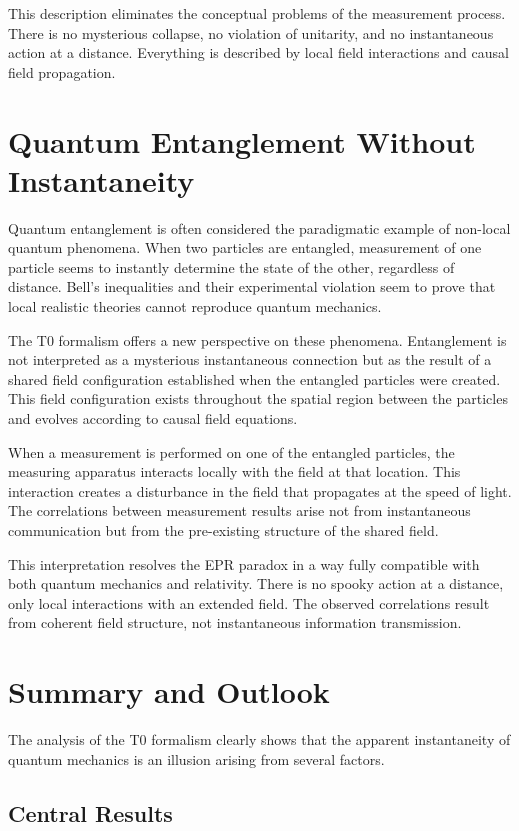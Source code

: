\documentclass[12pt,a4paper]{article}
\begin{document}
	This description eliminates the conceptual problems of the measurement process. There is no mysterious collapse, no violation of unitarity, and no instantaneous action at a distance. Everything is described by local field interactions and causal field propagation.
	
	\section{Quantum Entanglement Without Instantaneity}
	
	Quantum entanglement is often considered the paradigmatic example of non-local quantum phenomena. When two particles are entangled, measurement of one particle seems to instantly determine the state of the other, regardless of distance. Bell's inequalities and their experimental violation seem to prove that local realistic theories cannot reproduce quantum mechanics.
	
	The T0 formalism offers a new perspective on these phenomena. Entanglement is not interpreted as a mysterious instantaneous connection but as the result of a shared field configuration established when the entangled particles were created. This field configuration exists throughout the spatial region between the particles and evolves according to causal field equations.
	
	When a measurement is performed on one of the entangled particles, the measuring apparatus interacts locally with the field at that location. This interaction creates a disturbance in the field that propagates at the speed of light. The correlations between measurement results arise not from instantaneous communication but from the pre-existing structure of the shared field.
	
	This interpretation resolves the EPR paradox in a way fully compatible with both quantum mechanics and relativity. There is no spooky action at a distance, only local interactions with an extended field. The observed correlations result from coherent field structure, not instantaneous information transmission.
	
	\section{Summary and Outlook}
	
	The analysis of the T0 formalism clearly shows that the apparent instantaneity of quantum mechanics is an illusion arising from several factors.
	
	\subsection{Central Results}
	
\end{document}
